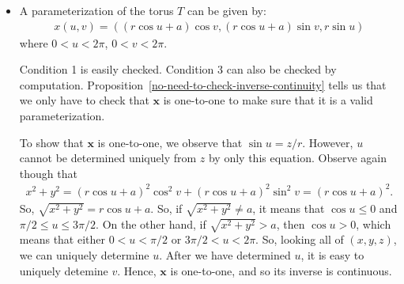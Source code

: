 \documentclass[10pt]{article}
\newcommand{\ve}[1]{\mathbf{#1}}
\begin{document}
\begin{itemize}
    \item A parameterization of the torus $T$ can be given by:
    \begin{align*}
      x(u,v) = ((r \cos u + a) \cos v, (r \cos u + a) \sin v, r \sin u)
    \end{align*}
    where $0 < u < 2\pi$, $0 < v < 2\pi$.

    Condition 1 is easily checked. Condition 3 can also be checked by computation. Proposition~\ref{no-need-to-check-inverse-continuity} tells us that we only have to check that $\ve{x}$ is one-to-one to make sure that it is a valid parameterization.

    To show that $\ve{x}$ is one-to-one, we observe that $\sin u = z/r$. However, $u$ cannot be determined uniquely from $z$ by only this equation. Observe again though that
    \begin{align*}
      x^2 + y^2 = (r \cos u + a)^2 \cos^2 v + (r \cos u + a)^2 \sin^2 v = (r \cos u + a)^2.
    \end{align*}
    So, $\sqrt{x^2 + y^2} = r\cos u + a$. So, if $\sqrt{x^2 + y^2} \neq a$, it means that $\cos u \leq 0$ and $\pi/2 \leq u \leq 3\pi/2$. On the other hand, if $\sqrt{x^2 + y^2} > a$, then $\cos u > 0$, which means that either $0 < u < \pi/2$ or $3\pi/2 < u < 2\pi$. So, looking all of $(x,y,z)$, we can uniquely determine $u$. After we have determined $u$, it is easy to uniquely detemine $v$. Hence, $\ve{x}$ is one-to-one, and so its inverse is continuous.
  \end{itemize}
  
\end{document}
